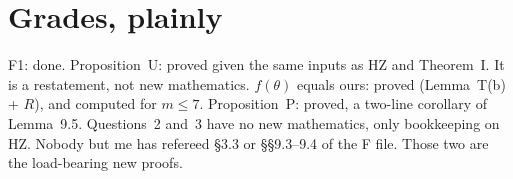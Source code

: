\documentclass[10pt]{amsart}
\theoremstyle{remark}
\begin{document}
\section{Grades, plainly}
F1: done. Proposition~U: proved given the same inputs as HZ and Theorem~I. It is a restatement, not new mathematics.
$f(\theta)$ equals ours: proved (Lemma~T(b) + $R$), and computed for $m\le7$. Proposition~P: proved, a two-line corollary of
Lemma~9.5. Questions~2 and~3 have no new mathematics, only bookkeeping on HZ. Nobody but me has refereed \S3.3 or
\S\S9.3--9.4 of the F file. Those two are the load-bearing new proofs.
\end{document}

